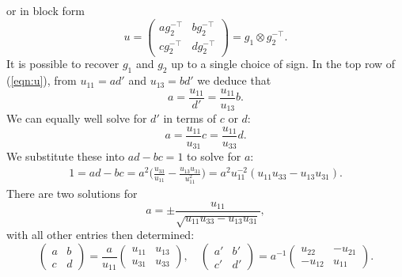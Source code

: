 \documentclass[11pt]{amsart}
\theoremstyle{definition}
\numberwithin{figure}{section}
\numberwithin{equation}{section}
\numberwithin{table}{section}
\begin{document}
or in block form
\begin{equation} \label{eqn:u-block}
u = \begin{pmatrix} a g_2^{-\top} & b g_2^{-\top} \\ c g_2^{-\top} & dg_2^{-\top}  \end{pmatrix}
= g_1 \otimes g_2^{-\top}.
\end{equation}
It is possible to recover $g_1$ and $g_2$ up to a single choice of sign.
In the top row of (\ref{eqn:u}), from $u_{11}=ad'$ and $u_{13}=bd'$ we deduce that
\[
a = \frac{u_{11}}{d'} = \frac{u_{11}}{u_{13}}b.
\]
We can equally well solve for $d'$ in terms of $c$ or $d$:
\[
a= \frac{u_{11}}{u_{31}} c = \frac{u_{11}}{u_{33}} d.
\]
We substitute these into $ad-bc=1$ to solve for $a$:
\begin{align*}
1 = ad-bc = a^2 \Big( \frac{u_{33}}{u_{11}}-\frac{u_{13}u_{31}}{u_{11}^2} \Big) = a^2 u_{11}^{-2} (u_{11}u_{33}-u_{13}u_{31})
.
\end{align*}
There are two solutions for
\begin{equation} \label{eqn:2to1a}
a= \pm \frac{u_{11}}{\sqrt{u_{11}u_{33}-u_{13}u_{31}}},
\end{equation}
with all other entries then determined:
\begin{equation} \label{eqn:u-to-g}
\begin{pmatrix} a & b \\ c & d \end{pmatrix} = \frac{a}{u_{11}} \begin{pmatrix} u_{11} & u_{13} \\ u_{31}& u_{33} \end{pmatrix}, 
\quad
\begin{pmatrix} a' & b' \\ c' & d' \end{pmatrix} = a^{-1} \begin{pmatrix} u_{22} & -u_{21} \\ -u_{12} & u_{11} \end{pmatrix}
.
\end{equation}
\end{document}
